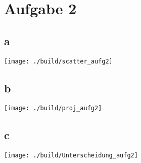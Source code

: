 \newpage\section{Aufgabe 2}
\subsection{a}
\begin{center}
\texttt{[image: ./build/scatter\_aufg2]}
\end{center}
\newpage
\subsection{b}
\hspace{-4cm}
\texttt{[image: ./build/proj\_aufg2]}
\subsection{c}
\hspace{-4cm}
\texttt{[image: ./build/Unterscheidung\_aufg2]}
